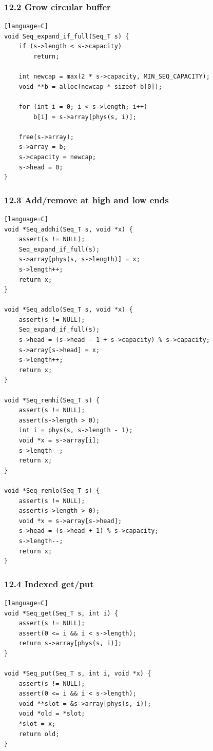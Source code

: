 \documentclass[11pt]{article}
\begin{document}
\subsubsection{12.2 Grow circular buffer}\label{grow-circular-buffer}

\begin{verbatim}[language=C]
void Seq_expand_if_full(Seq_T s) {
    if (s->length < s->capacity)
        return;

    int newcap = max(2 * s->capacity, MIN_SEQ_CAPACITY);
    void **b = alloc(newcap * sizeof b[0]);

    for (int i = 0; i < s->length; i++)
        b[i] = s->array[phys(s, i)];

    free(s->array);
    s->array = b;
    s->capacity = newcap;
    s->head = 0;
}
\end{verbatim}

\subsubsection{12.3 Add/remove at high and low ends}\label{addremove-at-high-and-low-ends}

\begin{verbatim}[language=C]
void *Seq_addhi(Seq_T s, void *x) {
    assert(s != NULL);
    Seq_expand_if_full(s);
    s->array[phys(s, s->length)] = x;
    s->length++;
    return x;
}

void *Seq_addlo(Seq_T s, void *x) {
    assert(s != NULL);
    Seq_expand_if_full(s);
    s->head = (s->head - 1 + s->capacity) % s->capacity;
    s->array[s->head] = x;
    s->length++;
    return x;
}

void *Seq_remhi(Seq_T s) {
    assert(s != NULL);
    assert(s->length > 0);
    int i = phys(s, s->length - 1);
    void *x = s->array[i];
    s->length--;
    return x;
}

void *Seq_remlo(Seq_T s) {
    assert(s != NULL);
    assert(s->length > 0);
    void *x = s->array[s->head];
    s->head = (s->head + 1) % s->capacity;
    s->length--;
    return x;
}
\end{verbatim}

\subsubsection{12.4 Indexed get/put}\label{indexed-getput}

\begin{verbatim}[language=C]
void *Seq_get(Seq_T s, int i) {
    assert(s != NULL);
    assert(0 <= i && i < s->length);
    return s->array[phys(s, i)];
}

void *Seq_put(Seq_T s, int i, void *x) {
    assert(s != NULL);
    assert(0 <= i && i < s->length);
    void **slot = &s->array[phys(s, i)];
    void *old = *slot;
    *slot = x;
    return old;
}
\end{verbatim}
\end{document}
